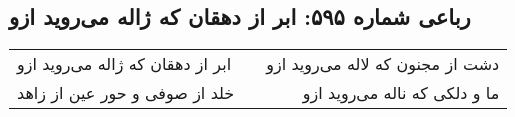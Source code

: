 \begin{center}
\section*{رباعی شماره ۵۹۵: ابر از دهقان که ژاله می‌روید ازو}
\label{sec:sh595}
\begin{longtable}{l p{0.5cm} r}
ابر از دهقان که ژاله می‌روید ازو
&&
دشت از مجنون که لاله می‌روید ازو
\\
خلد از صوفی و حور عین از زاهد
&&
ما و دلکی که ناله می‌روید ازو
\\
\end{longtable}
\end{center}
